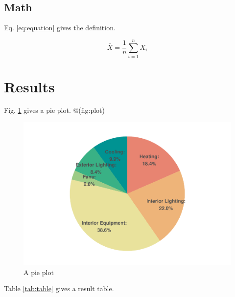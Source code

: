 \documentclass[]{elsarticle} %
\begin{document}
\hypertarget{math}{%
\subsection{Math}\label{math}}

Eq. \eqref{eq:equation} gives the definition.

\begin{equation}
  \bar{X}=\frac{1}{n}\sum_{i=1}^nX_i
  \label{eq:equation}
\end{equation}

\hypertarget{results}{%
\section{Results}\label{results}}

Fig. \ref{fig:plot} gives a pie plot.
@(fig:plot)

\begin{figure}[!htb]

{\centering \includegraphics[width=1\linewidth]{figuresplot-1} 

}

\caption{A pie plot}\label{fig:plot}
\end{figure}

Table \ref{tab:table} gives a result table.
\end{document}
